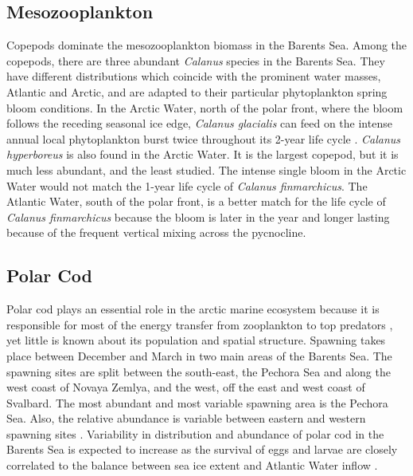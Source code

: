 \documentclass[a4paper, 12pt, Ariel]{article}
\begin{document}
\subsection{Mesozooplankton}
Copepods dominate the mesozooplankton biomass in the Barents Sea. Among the copepods, there are three abundant \textit{Calanus} species in the Barents Sea. They have different distributions which coincide with the prominent water masses, Atlantic and Arctic, and are adapted to their particular phytoplankton spring bloom conditions. In the Arctic Water, north of the polar front, where the bloom follows the receding seasonal ice edge, \textit{Calanus glacialis} can feed on the intense annual local phytoplankton burst twice throughout its 2-year life cycle \cite{Rey1987, Sakshaug2009}. \textit{Calanus hyperboreus} is also found in the Arctic Water. It is the largest copepod, but it is much less abundant, and the least studied. The intense single bloom in the Arctic Water would not match the 1-year life cycle of \textit{Calanus finmarchicus}. The Atlantic Water, south of the polar front, is a better match for the life cycle of \textit{Calanus finmarchicus} because the bloom is later in the year and longer lasting because of the frequent vertical mixing across the pycnocline.

\subsection{Polar Cod}
Polar cod plays an essential role in the arctic marine ecosystem because it is responsible for most of the energy transfer from zooplankton to top predators \cite{Welch1992}, yet little is known about its population and spatial structure.  Spawning takes place between December and March in two main areas of the Barents Sea. The spawning sites are split between the south-east, the Pechora Sea and along the west coast of Novaya Zemlya, and the west, off the east and west coast of Svalbard. The most abundant and most variable spawning area is the Pechora Sea. Also, the relative abundance is variable between eastern and western spawning sites \cite{Eriksen2015}. Variability in distribution and abundance of polar cod in the Barents Sea is expected to increase as the survival of eggs and larvae are closely correlated to the balance between sea ice extent and Atlantic Water inflow \cite{Hop2013, Eriksen2019, Huserbraaten2019}. \\
\end{document}
